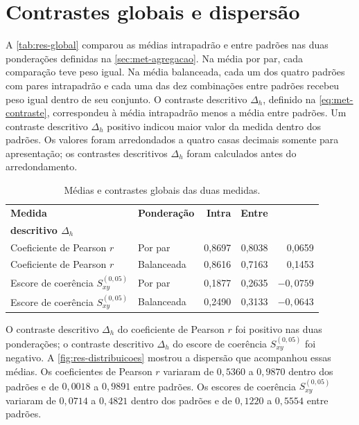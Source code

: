 \clearpage
\section{Contrastes globais e dispersão}\label{sec:res-limite-estat}

A \autoref{tab:res-global} comparou as médias intrapadrão e entre padrões nas duas
ponderações definidas na \autoref{sec:met-agregacao}. Na média por par, cada
comparação teve peso igual. Na média balanceada, cada um dos quatro padrões
com pares intrapadrão e cada uma das dez combinações entre padrões recebeu peso
igual dentro de seu conjunto. O contraste descritivo $\Delta_h$, definido na
\autoref{eq:met-contraste}, correspondeu à média intrapadrão menos a média entre
padrões. Um contraste descritivo $\Delta_h$ positivo indicou maior valor da medida
dentro dos padrões. Os valores foram arredondados a quatro casas decimais somente
para apresentação; os contrastes descritivos $\Delta_h$ foram calculados antes do
arredondamento.

\begin{table}[htbp]
  \centering
  \caption{Médias e contrastes globais das duas medidas.}
  \label{tab:res-global}
  \small
  \begin{tabular}{l l r r r}
    \hline
    \textbf{Medida} & \textbf{Ponderação} & \textbf{Intra} & \textbf{Entre} &
    \shortstack{\textbf{Contraste}\\\textbf{descritivo $\Delta_h$}}\\
    \hline
    Coeficiente de Pearson $r$ & Por par & 0,8697 & 0,8038 & 0,0659\\
    Coeficiente de Pearson $r$ & Balanceada & 0,8616 & 0,7163 & 0,1453\\
    Escore de coerência $S_{xy}^{(0{,}05)}$ & Por par & 0,1877 & 0,2635 & $-0{,}0759$\\
    Escore de coerência $S_{xy}^{(0{,}05)}$ & Balanceada & 0,2490 & 0,3133 & $-0{,}0643$\\
    \hline
  \end{tabular}
\end{table}

O contraste descritivo $\Delta_h$ do coeficiente de Pearson $r$ foi positivo nas duas
ponderações; o contraste descritivo $\Delta_h$ do escore de coerência
$S_{xy}^{(0{,}05)}$ foi negativo. A \autoref{fig:res-distribuicoes} mostrou a
dispersão que acompanhou essas médias. Os coeficientes de Pearson $r$ variaram
de $0{,}5360$ a $0{,}9870$ dentro dos padrões e de $0{,}0018$ a $0{,}9891$
entre padrões. Os escores de coerência $S_{xy}^{(0{,}05)}$ variaram de
$0{,}0714$ a $0{,}4821$ dentro dos padrões e de $0{,}1220$ a $0{,}5554$
entre padrões.

